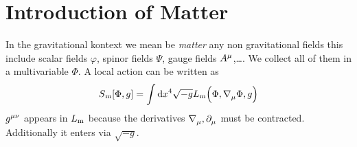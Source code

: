 \section{Introduction of Matter}
In the gravitational kontext we mean be \emph{matter} any non gravitational
fields this include scalar fields $\varphi$, spinor fields $\Psi$, gauge fields
$\tensor{A}{^\mu}$,\dots. We collect all of them in a multivariable $\Phi$.
A local action can be written as
\begin{equation}
S\textsubscript{m}[\Phi,g]=\int \dif x^4\sqrt{-g}
L\textsubscript{m}\left(\Phi,\tensor{\nabla}{_\mu}\Phi,g\right)
\end{equation}
$\tensor{g}{^\mu^\nu}$ appears in $L\textsubscript{m}$ because the derivatives
$\tensor{\nabla}{_\mu}, \tensor{\partial}{_\mu}$ must be contracted.
Additionally it enters via $\sqrt{-g}$.

